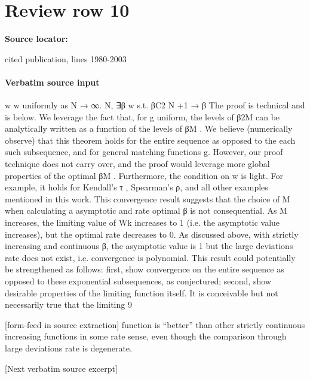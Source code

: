 \documentclass[10pt]{article}
\begin{document}
\section*{Review row 10}
\textbf{Source locator:} {\footnotesize\raggedright cited publication, lines 1980-\allowbreak{}2003\par}
\paragraph{Verbatim source input}
\begin{ReviewVerbatim}
w
w uniformly as N → ∞.
N, ∃β w s.t. βC2
N +1 → β
The proof is technical and is below. We leverage the fact that, for g uniform, the levels of β2M
can be analytically written as a function of the levels of βM . We believe (numerically observe)
that this theorem holds for the entire sequence as opposed to the each such subsequence, and for
general matching functions g. However, our proof technique does not carry over, and the proof
would leverage more global properties of the optimal βM .
Furthermore, the condition on w is light. For example, it holds for Kendall’s τ , Spearman’s ρ,
and all other examples mentioned in this work.
This convergence result suggests that the choice of M when calculating a asymptotic and rate
optimal β is not consequential. As M increases, the limiting value of Wk increases to 1 (i.e. the
asymptotic value increases), but the optimal rate decreases to 0. As discussed above, with strictly
increasing and continuous β, the asymptotic value is 1 but the large deviations rate does not exist,
i.e. convergence is polynomial.
This result could potentially be strengthened as follows: first, show convergence on the entire
sequence as opposed to these exponential subsequences, as conjectured; second, show desirable
properties of the limiting function itself. It is conceivable but not necessarily true that the limiting
9


[form-feed in source extraction]
function is “better” than other strictly continuous increasing functions in some rate sense, even
though the comparison through large deviations rate is degenerate.


[Next verbatim source excerpt]


\end{ReviewVerbatim}
\end{document}
